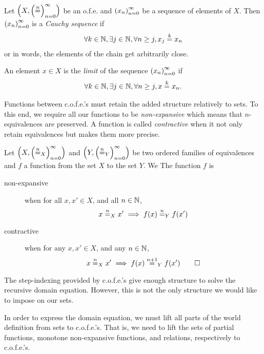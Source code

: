 \begin{jversion}
\begin{definition}
  Let $\cofe{X}$ be an o.f.e. and $\seq{x}$ be a sequence of
  elements of $X$. Then $\seq{x}$ is a \emph{Cauchy sequence} if
  \begin{align*}
    \forall k \in \nats, \exists j \in \nats, \forall n \geq j, x_j \nequal[k] x_n
  \end{align*}
  or in words, the elements of the chain get arbitrarily close.

  An element $x \in X$ is the \emph{limit} of the sequence $\seq{x}$ if
  \begin{align*}
    \forall k \in \nats, \exists j \in \nats, \forall n \geq j, x \nequal[k] x_n.
  \end{align*}
\end{definition}
Functions between c.o.f.e.'s must retain the added structure relatively to sets.
To this end, we require all our functions to be \emph{non-expansive} which means that $n$-equivalences are preserved.
A function is called \emph{contractive} when it not only retain equivalences but makes them more precise.
\begin{definition}
  \label{def:nonexpansive-contractive-ofe}
  Let $\left(X,\left(\nequal[n]_X\right)_{n=0}^{\infty} \right)$ and $\left(Y,\left(\nequal[n]_Y\right)_{n=0}^{\infty} \right)$ be two ordered families of equivalences and $f$ a function from the set $X$ to the set $Y$.
  We 
  The function $f$ is
  \begin{description}
  \item[non-expansive] when for all $x, x' \in X$, and all $n \in \nats$,
\[
  x \nequal_X x' \implies f(x) \nequal_Y f(x')
\]
  \item[contractive] when for any $x, x' \in X$, and any $n \in \nats$,
\[
  x \nequal_X x' \implies f(x) \nequal[n+1]_Y f(x') 
  \qedhere
\]
  \end{description}
\end{definition}
\noindent The step-indexing provided by c.o.f.e.'s give enough structure to solve the recursive domain equation.
However, this is not the only structure we would like to impose on our sets.

In order to express the domain equation, we must lift all parts of the world definition from sets to c.o.f.e.'s.
That is, we need to lift the sets of partial functions, monotone non-expansive functions, and relations, respectively to c.o.f.e.'s.


\end{jversion}

